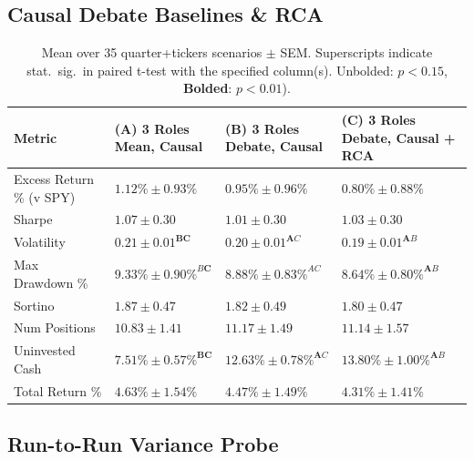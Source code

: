 \documentclass{article}
\begin{document}
\subsection{Causal Debate Baselines \& RCA}
\label{app:debate_rca}

\begin{table}[H]
\centering\small
\begin{tabular}{llll}
\toprule
Metric & \shortstack{(A) 3 Roles \\ Mean, Causal} & \shortstack{(B) 3 Roles \\ Debate, Causal} & \shortstack{(C) 3 Roles \\ Debate, Causal + RCA} \\
\midrule
Excess Return \% (v SPY) & $1.12\% \pm 0.93\%$ & $0.95\% \pm 0.96\%$ & $0.80\% \pm 0.88\%$ \\
 Sharpe & $1.07 \pm 0.30$ & $1.01 \pm 0.30$ & $1.03 \pm 0.30$ \\
 Volatility & ${0.21 \pm 0.01}^{\mathbf{B}\mathbf{C}}$ & ${0.20 \pm 0.01}^{\mathbf{A}C}$ & ${0.19 \pm 0.01}^{\mathbf{A}B}$ \\
Max Drawdown \% & ${9.33\% \pm 0.90\%}^{B\mathbf{C}}$ & ${8.88\% \pm 0.83\%}^{AC}$ & ${8.64\% \pm 0.80\%}^{\mathbf{A}B}$ \\
 Sortino & $1.87 \pm 0.47$ & $1.82 \pm 0.49$ & $1.80 \pm 0.47$ \\
Num Positions & $10.83 \pm 1.41$ & $11.17 \pm 1.49$ & $11.14 \pm 1.57$ \\
Uninvested Cash & ${7.51\% \pm 0.57\%}^{\mathbf{B}\mathbf{C}}$ & ${12.63\% \pm 0.78\%}^{\mathbf{A}C}$ & ${13.80\% \pm 1.00\%}^{\mathbf{A}B}$ \\
Total Return \% & $4.63\% \pm 1.54\%$ & $4.47\% \pm 1.49\%$ & $4.31\% \pm 1.41\%$ \\
\bottomrule
\end{tabular}
\vspace{4pt}
\caption{Mean over 35 quarter+tickers scenarios $\pm$ SEM. Superscripts indicate stat.\ sig.\ in paired t-test with the specified column(s). Unbolded: $p < 0.15$, \textbf{Bolded}: $p < 0.01$).}
\label{tab:debate_rca}
\end{table}

\subsection{Run-to-Run Variance Probe}
\label{app:seed-variance}
\end{document}
